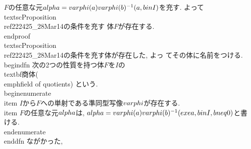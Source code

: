   $F$の任意な元$\\alpha=\\varphi(a)\\varphi(b)^{-1}(a, b\\in I)$を充す.
  よって\\textsc{Proposition}~\\ref{222425_28Mar14}の条件を充す
  体$F$が存在する.
 \\end{proof} 
 \\textsc{Proposition}~\\ref{222425_28Mar14}の条件を充す体が存在した, よっ
 てその体に名前をつける.
\\begin{dfn}
 次の2つの性質を持つ体$F$を$I$の\\textbf{商体}(\\emph{field of quotients})
 という.
 \\begin{enumerate}
  \\item $I$から$F$への単射である準同型写像$\\varphi$が存在する.
  \\item $F$の任意な元$\\alpha$は, $\\alpha=\\varphi(a)\\varphi(b)^{-1}(\\exe
        a,b\\in I,b\\neq 0)$と書ける.
 \\end{enumerate}
\\end{dfn}
ながかった,
